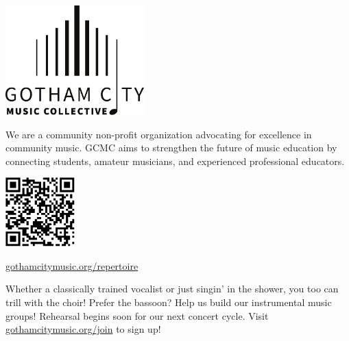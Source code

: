 \documentclass{article}[10pt]
\newcommand{\logo}{
        {\includegraphics[width=0.4\textwidth]{../../graphic_design_assets/bw_logo_full}}
}
\newcommand{\tunedspace}{\vspace{0.15in}}
\begin{document}
\begin{center}
        \pagebreak


        {\logo}

        \tunedspace

        \begin{minipage}{4in}


            \begin{small}
                We are a community non-profit organization advocating for excellence in community music.
                GCMC aims to strengthen the future of music education by connecting students, amateur musicians, and experienced professional educators.
            \end{small}

            \begin{center}
            {\textbf{}}

                \vspace{0.1in}

                {\includegraphics[width=0.2\textwidth]{../../graphic_design_assets/gotham_city_music_collective_program.png}}

                \href{https://gothamcitymusic.org/repertoire}{gothamcitymusic.org/repertoire}
            \end{center}

            \begin{center}
            {\textbf{}}
            \end{center}

            \vspace{-0.1in}

            \begin{small}
                Whether a classically trained vocalist or just singin' in the shower,
                you too can trill with the choir!
                Prefer the bassoon?
                Help us build our instrumental music groups!
                Rehearsal begins soon for our next concert cycle.
                Visit {\href{gothamcitymusic.org/join}{gothamcitymusic.org/join}} to sign up!
            \end{small}


\end{minipage}
\end{center}
\end{document}
